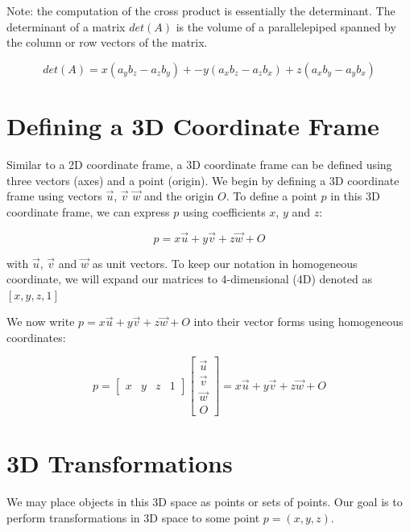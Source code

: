 \documentclass[12pt,letterpaper]{article}
\begin{document}
Note: the computation of the cross product is essentially the determinant. The determinant of a matrix $det(A)$ is the volume of a parallelepiped spanned by the column or row vectors of the matrix.

\begin{equation}
   det(A) = x(a_y b_z - a_z b_y) + -y(a_x b_z - a_z b_x) + z (a_x b_y - a_y b_x)
\end{equation}

\section{Defining a 3D Coordinate Frame}
Similar to a 2D coordinate frame, a 3D coordinate frame can be defined using three vectors (axes) and a point (origin). We begin by defining a 3D coordinate frame using vectors  $\overrightarrow{u}$, $\overrightarrow{v}$ $\overrightarrow{w}$ and the origin $O$. To define a point $p$ in this 3D coordinate frame, we can express $p$ using coefficients $x$, $y$ and $z$:

\begin{equation}
   p = x\overrightarrow{u} + y\overrightarrow{v} + z\overrightarrow{w} + O
\end{equation}

with $\overrightarrow{u}$, $\overrightarrow{v}$ and $\overrightarrow{w}$ as unit vectors. To keep our notation in homogeneous coordinate, we will expand our matrices to 4-dimensional (4D) denoted as $[x, y, z, 1]$

We now write $p = x\overrightarrow{u} + y\overrightarrow{v} + z\overrightarrow{w} + O$ into their vector forms using homogeneous coordinates:

\begin{equation}
    p = \begin{bmatrix}
        x & y & z & 1
    \end{bmatrix}
    \begin{bmatrix}
        \overrightarrow{u} \\
        \overrightarrow{v} \\
        \overrightarrow{w} \\
        O
    \end{bmatrix}
    = x\overrightarrow{u} + y\overrightarrow{v} + z\overrightarrow{w} + O
\end{equation}

\newpage

\section{3D Transformations}
We may place objects in this 3D space as points or sets of points. Our goal is to perform transformations in 3D space to some point $p = (x, y, z)$.
\end{document}
